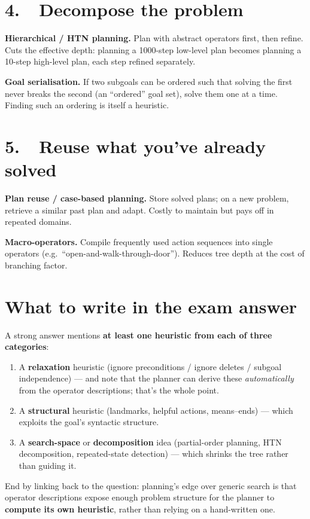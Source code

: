 \documentclass[11pt,a4paper]{article}
\begin{document}
\section*{4.\ \ Decompose the problem}

\textbf{Hierarchical / HTN planning.} Plan with abstract operators first, then refine. Cuts the effective depth: planning a 1000-step low-level plan becomes planning a 10-step high-level plan, each step refined separately.

\textbf{Goal serialisation.} If two subgoals can be ordered such that solving the first never breaks the second (an ``ordered'' goal set), solve them one at a time. Finding such an ordering is itself a heuristic.

\section*{5.\ \ Reuse what you've already solved}

\textbf{Plan reuse / case-based planning.} Store solved plans; on a new problem, retrieve a similar past plan and adapt. Costly to maintain but pays off in repeated domains.

\textbf{Macro-operators.} Compile frequently used action sequences into single operators (e.g.\ ``open-and-walk-through-door''). Reduces tree depth at the cost of branching factor.

\section*{What to write in the exam answer}

A strong answer mentions \textbf{at least one heuristic from each of three categories}:

\begin{enumerate}[leftmargin=*,itemsep=2pt]
  \item A \textbf{relaxation} heuristic (ignore preconditions / ignore deletes / subgoal independence) --- and note that the planner can derive these \emph{automatically} from the operator descriptions; that's the whole point.
  \item A \textbf{structural} heuristic (landmarks, helpful actions, means--ends) --- which exploits the goal's syntactic structure.
  \item A \textbf{search-space} or \textbf{decomposition} idea (partial-order planning, HTN decomposition, repeated-state detection) --- which shrinks the tree rather than guiding it.
\end{enumerate}

End by linking back to the question: planning's edge over generic search is that operator descriptions expose enough problem structure for the planner to \textbf{compute its own heuristic}, rather than relying on a hand-written one.
\end{document}
